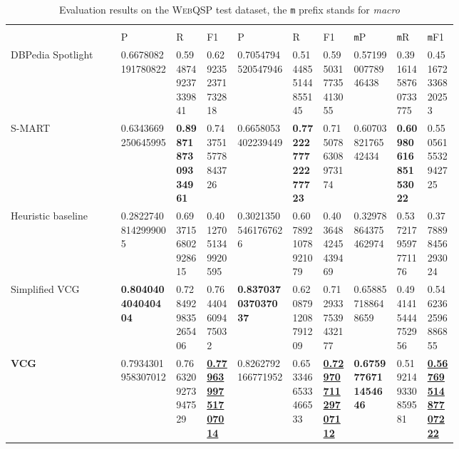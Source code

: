 \documentclass[11pt,a4paper]{article}
\begin{document}
\begin{table*}[t]
  \begin{center}
  \begin{tabular}{>{\raggedleft}p{0.18\linewidth}
  >{\raggedleft}p{0.09\linewidth}
  >{\raggedleft}p{0.05\linewidth}
  >{\raggedleft}p{0.05\linewidth}
  >{\raggedleft}p{0.09\linewidth}
  >{\raggedleft}p{0.05\linewidth}
  >{\raggedleft}p{0.05\linewidth}
  >{\raggedleft}p{0.07\linewidth}
  >{\raggedleft}p{0.05\linewidth}
  >{\raggedleft\arraybackslash}p{0.05\linewidth}}
  \toprule
  & \multicolumn{3}{c}{Main entity} & \multicolumn{6}{c}{All entities} \\  
   & P & R & F1 & P & R & F1 & \texttt{m}P & \texttt{m}R & \texttt{m}F1\\ 
   \midrule 
   DBPedia Spotlight  & \num{0.6678082191780822} & \num{0.5948749237339841} & \num{0.6292352371732818} & \num{0.7054794520547946} & \num{0.5144855144855145} & \num{0.5950317735413055} & \num{0.5719900778946438} & \num{0.39161458760733775} & \num{0.451672336820253} \\
   S-MART & \num{0.6343669250645995} & \textbf{\num{0.8987187309334961}} & \num{0.7437515778843726}  & \num{0.6658053402239449} & \textbf{\num{0.7722277722277723}} & \num{0.7150786308973174} & \num{0.6070382176542434} & \textbf{\num{0.6098061685153022}}  & \num{0.5505615532942725} \\
   \midrule
  Heuristic baseline & \num{0.28227408142999005} & \num{0.6937156802928615} & \num{0.40127051349920595} & \num{0.30213505461767626} & \num{0.6078921078921079} & \num{0.4036484245439469} & \num{0.32978864375462974} & \num{0.5372179597771176} & \num{0.3778898456293024} \\
  Simplified VCG & \textbf{\num{0.804040404040404}} & \num{0.7284929835265406} & \num{0.764404609475032} & \textbf{\num{0.837037037037037}} & \num{0.6208791208791209} & \num{0.7129337539432177} & \num{0.658857188648659} & \num{0.4941415444752956} & \num{0.5462362596886855} \\ 
  \textbf{VCG}  & \num{0.7934301958307012} & \num{0.7663209273947529} & \underline{\textbf{\num{0.7796399751707014}}}  & \num{0.8262792166771952} & \num{0.6533466533466533} & \underline{\textbf{\num{0.7297071129707112}}} & \textbf{\num{0.6759776711454646}} & \num{0.5192149330859581} & \underline{\textbf{\num{0.5676951487707222}}} \\ 
  \bottomrule
  \end{tabular} 
  \end{center}
  \caption{Evaluation results on the \textsc{WebQSP} test dataset, the \texttt{m} prefix stands for \textit{macro} \label{table:eval-webqsp-test}}
\end{table*}
\end{document}
